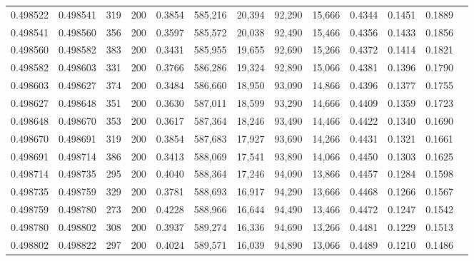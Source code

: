 \begin{tabular}{rrrrrrrrrrrrr}
0.498522 & 0.498541 &   319 & 200 &                                     0.3854 & 585,216 &  20,394 &  92,290 &  15,666 & 0.4344 & 0.1451 & 0.1889 \\
0.498541 & 0.498560 &   356 & 200 &                                     0.3597 & 585,572 &  20,038 &  92,490 &  15,466 & 0.4356 & 0.1433 & 0.1856 \\
0.498560 & 0.498582 &   383 & 200 &                                     0.3431 & 585,955 &  19,655 &  92,690 &  15,266 & 0.4372 & 0.1414 & 0.1821 \\
0.498582 & 0.498603 &   331 & 200 &                                     0.3766 & 586,286 &  19,324 &  92,890 &  15,066 & 0.4381 & 0.1396 & 0.1790 \\
0.498603 & 0.498627 &   374 & 200 &                                     0.3484 & 586,660 &  18,950 &  93,090 &  14,866 & 0.4396 & 0.1377 & 0.1755 \\
0.498627 & 0.498648 &   351 & 200 &                                     0.3630 & 587,011 &  18,599 &  93,290 &  14,666 & 0.4409 & 0.1359 & 0.1723 \\
0.498648 & 0.498670 &   353 & 200 &                                     0.3617 & 587,364 &  18,246 &  93,490 &  14,466 & 0.4422 & 0.1340 & 0.1690 \\
0.498670 & 0.498691 &   319 & 200 &                                     0.3854 & 587,683 &  17,927 &  93,690 &  14,266 & 0.4431 & 0.1321 & 0.1661 \\
0.498691 & 0.498714 &   386 & 200 &                                     0.3413 & 588,069 &  17,541 &  93,890 &  14,066 & 0.4450 & 0.1303 & 0.1625 \\
0.498714 & 0.498735 &   295 & 200 &                                     0.4040 & 588,364 &  17,246 &  94,090 &  13,866 & 0.4457 & 0.1284 & 0.1598 \\
0.498735 & 0.498759 &   329 & 200 &                                     0.3781 & 588,693 &  16,917 &  94,290 &  13,666 & 0.4468 & 0.1266 & 0.1567 \\
0.498759 & 0.498780 &   273 & 200 &                                     0.4228 & 588,966 &  16,644 &  94,490 &  13,466 & 0.4472 & 0.1247 & 0.1542 \\
0.498780 & 0.498802 &   308 & 200 &                                     0.3937 & 589,274 &  16,336 &  94,690 &  13,266 & 0.4481 & 0.1229 & 0.1513 \\
0.498802 & 0.498822 &   297 & 200 &                                     0.4024 & 589,571 &  16,039 &  94,890 &  13,066 & 0.4489 & 0.1210 & 0.1486 \\

\end{tabular}
